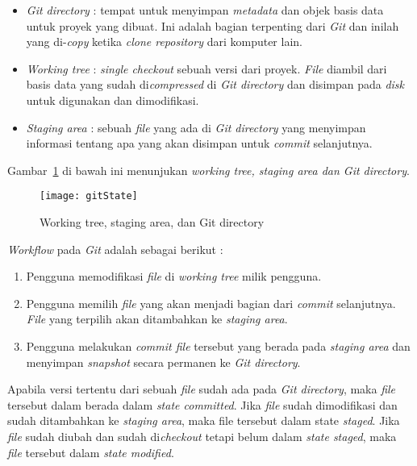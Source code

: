 \begin{itemize}
	\item \textit{Git directory} : tempat untuk menyimpan \textit{metadata} dan objek basis data untuk proyek yang dibuat. Ini adalah bagian terpenting dari \textit{Git} dan inilah yang di-\textit{copy} ketika \textit{clone repository} dari komputer lain.
	\item \textit{Working tree} : \textit{single checkout} sebuah versi dari proyek. \textit{File} diambil dari basis data yang sudah di\textit{compressed} di \textit{Git directory} dan disimpan pada \textit{disk} untuk digunakan dan dimodifikasi.
	\item \textit{Staging area} : sebuah \textit{file} yang ada di \textit{Git directory} yang menyimpan informasi tentang apa yang akan disimpan untuk \textit{commit} selanjutnya.  
\end{itemize}

Gambar~\ref{fig:gitState} di bawah ini menunjukan \textit{working tree, staging area dan Git directory}.

\begin{figure}[H]
	\centering  
	\texttt{[image: gitState]}  
	\caption[Working tree, staging area, dan Git directory]{Working tree, staging area, dan Git directory}
	\label{fig:gitState} 
\end{figure}

\textit{Workflow} pada \textit{Git} adalah sebagai berikut :

\begin{enumerate}
	\item Pengguna memodifikasi \textit{file} di \textit{working tree} milik pengguna.
	\item Pengguna memilih \textit{file} yang akan menjadi bagian dari \textit{commit} selanjutnya. \textit{File} yang terpilih akan ditambahkan ke \textit{staging area}. 
	\item Pengguna melakukan \textit{commit file} tersebut yang berada pada \textit{staging area} dan menyimpan \textit{snapshot} secara permanen ke \textit{Git directory}.
\end{enumerate}

Apabila versi tertentu dari sebuah \textit{file} sudah ada pada \textit{Git directory}, maka \textit{file} tersebut dalam berada dalam \textit{state committed}. Jika \textit{file} sudah dimodifikasi dan sudah ditambahkan ke \textit{staging area}, maka file tersebut dalam state \textit{staged}. Jika \textit{file} sudah diubah dan sudah di\textit{checkout} tetapi belum dalam \textit{state staged}, maka \textit{file} tersebut dalam \textit{state modified}.\\

